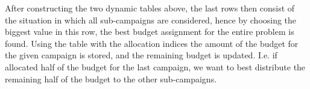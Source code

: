 After constructing the two dynamic tables above, the last rows then consist of the situation in which all sub-campaigns are considered, hence by choosing the biggest value in this row, the best budget assignment for the entire problem is found. Using the table with the allocation indices the amount of the budget for the given campaign is stored, and the remaining budget is updated. I.e. if allocated half of the budget for the last campaign, we want to best distribute the remaining half of the budget to the other sub-campaigns.

